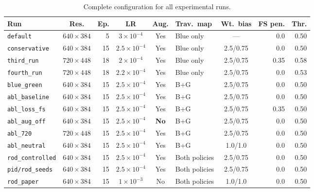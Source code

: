 \documentclass[12pt,a4paper]{report}
\begin{document}
\begin{table}[H]
\centering
\caption{Complete configuration for all experimental runs.}
\label{tab:all_configs}
\scriptsize
\begin{tabular}{@{}lcrcclcrr@{}}
\toprule
\textbf{Run} & \textbf{Res.} & \textbf{Ep.} & \textbf{LR} & \textbf{Aug.} & \textbf{Trav.\ map} & \textbf{Wt.\ bias} & \textbf{FS pen.} & \textbf{Thr.} \\
\midrule
\texttt{default}       & $640\times384$ & 5  & $3\!\times\!10^{-4}$   & Yes & Blue only & --- & 0.0  & 0.50 \\
\texttt{conservative}  & $640\times384$ & 15 & $2.5\!\times\!10^{-4}$ & Yes & Blue only & 2.5/0.75 & 0.0  & 0.50 \\
\texttt{third\_run}    & $720\times448$ & 18 & $2\!\times\!10^{-4}$   & Yes & Blue only & 2.5/0.75 & 0.35 & 0.58 \\
\texttt{fourth\_run}   & $720\times448$ & 18 & $2.2\!\times\!10^{-4}$ & Yes & Blue only & 2.5/0.75 & 0.0  & 0.53 \\
\texttt{blue\_green}   & $640\times384$ & 15 & $2.5\!\times\!10^{-4}$ & Yes & B+G       & 2.5/0.75 & 0.0  & 0.50 \\
\midrule
\texttt{abl\_baseline} & $640\times384$ & 15 & $2.5\!\times\!10^{-4}$ & Yes & B+G       & 2.5/0.75 & 0.0  & 0.50 \\
\texttt{abl\_loss\_fs}  & $640\times384$ & 15 & $2.5\!\times\!10^{-4}$ & Yes & B+G       & 2.5/0.75 & 0.35 & 0.50 \\
\texttt{abl\_aug\_off} & $640\times384$ & 15 & $2.5\!\times\!10^{-4}$ & \textbf{No} & B+G  & 2.5/0.75 & 0.0  & 0.50 \\
\texttt{abl\_720}      & $720\times448$ & 15 & $2.5\!\times\!10^{-4}$ & Yes & B+G       & 2.5/0.75 & 0.0  & 0.50 \\
\texttt{abl\_neutral}  & $640\times384$ & 15 & $2.5\!\times\!10^{-4}$ & Yes & B+G       & 1.0/1.0  & 0.0  & 0.50 \\
\midrule
\texttt{rod\_controlled} & $640\times384$ & 15 & $2.5\!\times\!10^{-4}$ & Yes & Both policies & 2.5/0.75 & 0.0 & 0.50 \\
\texttt{pid/rod\_seeds} & $640\times384$ & 15 & $2.5\!\times\!10^{-4}$ & Yes & Both policies & 2.5/0.75 & 0.0 & 0.50 \\
\texttt{rod\_paper} & $640\times384$ & 15 & $1\!\times\!10^{-3}$ & No & Both policies & 1.0/1.0 & 0.0 & 0.50 \\
\bottomrule
\end{tabular}
\end{table}
\end{document}
